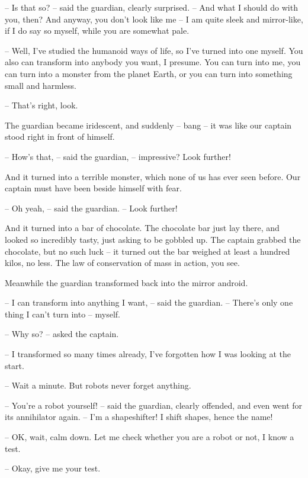 \documentclass[ebook,oneside,final,openright]{memoir}
\begin{document}
– Is that so? – said the guardian, clearly surprised. – And what I should do with you, then? And anyway, you don’t look like me – I am quite sleek and mirror-like, if I do say so myself, while you are somewhat pale.\par
– Well, I’ve studied the humanoid ways of life, so I’ve turned into one myself. You also can transform into anybody you want, I presume. You can turn into me, you can turn into a monster from the planet Earth, or you can turn into something small and harmless.\par
– That’s right, look.\par
\par
The guardian became iridescent, and suddenly – bang – it was like our captain stood right in front of himself.\par
– How’s that, – said the guardian, – impressive? Look further!\par
And it turned into a terrible monster, which none of us has ever seen before. Our captain must have been beside himself with fear.\par
– Oh yeah, – said the guardian. – Look further!\par
\par
And it turned into a bar of chocolate. The chocolate bar just lay there, and looked so incredibly tasty, just asking to be gobbled up. The captain grabbed the chocolate, but no such luck – it turned out the bar weighed at least a hundred kilos, no less. The law of conservation of mass in action, you see.\par
\par
Meanwhile the guardian transformed back into the mirror android.\par
– I can transform into anything I want, – said the guardian. – There’s only one thing I can’t turn into – myself.\par
– Why so? – asked the captain.\par
– I transformed so many times already, I’ve forgotten how I was looking at the start.\par
– Wait a minute. But robots never forget anything.\par
– You’re a robot yourself! – said the guardian, clearly offended, and even went for its annihilator again. – I’m a shapeshifter! I shift shapes, hence the name!\par
– OK, wait, calm down. Let me check whether you are a robot or not, I know a test.\par
– Okay, give me your test.\par
\end{document}
